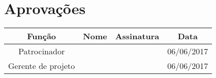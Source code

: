 \section{Aprovações}

\begin{table}[H]
	\begin{tabularx}{\textwidth}{| c | c | X | c |}
		\hline
		\textbf{Função}  & \textbf{Nome}         & \textbf{Assinatura}        & \textbf{Data} \\
		\hline
		Patrocinador       & \projectSponsorName{} & \projectSponsorSignature{} & 06/06/2017    \\
		\hline
		Gerente de projeto & \projectManagerName{} & \projectManagerSignature{} & 06/06/2017    \\
		\hline
	\end{tabularx}
	\centering
\end{table}